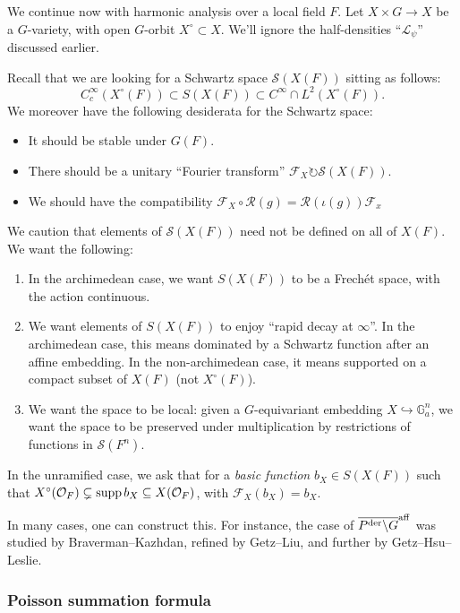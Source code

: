 \documentclass[reqno]{amsart} 
\numberwithin{theorem}{section}
\numberwithin{equation}{section}
\numberwithin{exercise}{section}
\begin{document}
We continue now with harmonic analysis over a local field $F$.  Let $X \times G \rightarrow X$ be a $G$-variety, with open $G$-orbit $X^{\circ} \subset X$.  We'll ignore the half-densities ``$\mathcal{L}_\psi$'' discussed earlier.

Recall that we are looking for a Schwartz space $\mathcal{S}(X(F))$ sitting as follows:
\begin{equation*}
  C_c^\infty(X^{\circ}(F)) \subset S(X(F)) \subset C^\infty \cap L^2(X^{\circ}(F)).
\end{equation*}
We moreover have the following desiderata for the Schwartz space:
\begin{itemize}
\item It should be stable under $G(F)$.
\item There should be a unitary ``Fourier transform'' $\mathcal{F}_X \circlearrowright \mathcal{S}(X(F))$.
\item We should have the compatibility $\mathcal{F}_X \circ \mathcal{R}(g) = \mathcal{R}(\iota(g)) \mathcal{F}_x$
\end{itemize}
We caution that elements of $\mathcal{S}(X(F))$ need not be defined on all of $X(F)$.  We want the following:
\begin{enumerate}
\item In the archimedean case, we want $S(X(F))$ to be a Frechét space, with the action continuous.
\item We want elements of $S(X(F))$ to enjoy ``rapid decay at $\infty$''.  In the archimedean case, this means dominated by a Schwartz function after an affine embedding.  In the non-archimedean case, it means supported on a compact subset of $X(F)$ (not $X^{\circ}(F)$).
\item We want the space to be local: given a $G$-equivariant embedding $X \hookrightarrow \mathbb{G}_a^n $, we want the space to be preserved under multiplication by restrictions of functions in $\mathcal{S}(F^n)$.
\end{enumerate}
In the unramified case, we ask that for a \emph{basic function} $b_X \in S(X(F))$ such that $X^{\circ}(\mathcal{O}_F) \subsetneq \operatorname{supp} b_X \subseteq X(\mathcal{O}_F)$, with $\mathcal{F}_X(b_X) = b_X$.

In many cases, one can construct this.  For instance, the case of $\overline{P^{\operatorname{der}} \backslash G}^{\mathrm{aff}}$ was studied by Braverman--Kazhdan, refined by Getz--Liu, and further by Getz--Hsu--Leslie.

\subsubsection{Poisson summation formula}\label{sec:cq6txpqnif}
\end{document}

